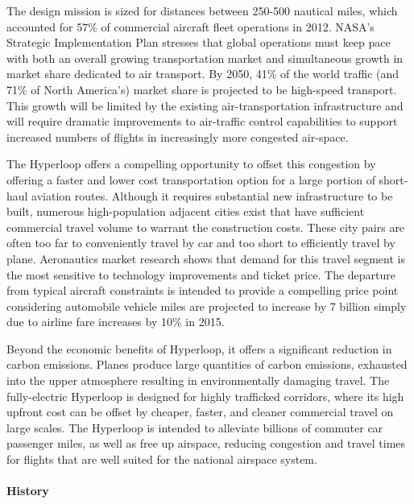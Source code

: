     The design mission is sized for distances between 250-500 nautical miles,
    which accounted for 57\% of commercial aircraft fleet operations in 2012.
    NASA's Strategic Implementation Plan stresses that global operations must
    keep pace with both an overall growing transportation market and
    simultaneous growth in market share dedicated to air transport.
    By 2050, 41\% of the world traffic (and 71\% of North America's) market share is
    projected to be high-speed transport. \cite{Schafer} This growth will be
    limited by the existing air-transportation infrastructure and will require
    dramatic improvements to air-traffic control capabilities to support
    increased numbers of flights in increasingly more congested air-space.

    The Hyperloop offers a compelling opportunity to offset this congestion by
    offering a faster and lower cost transportation option for a large portion
    of short-haul aviation routes. Although it requires substantial
    new infrastructure to be built, numerous high-population adjacent
    cities exist that have sufficient commercial travel volume to warrant the
    construction costs. These city pairs are often too far to conveniently
    travel by car and too short to efficiently travel by plane.
    Aeronautics market research shows that demand for this travel segment is
    the most sensitive to technology improvements and ticket price.\cite{Baik}
    The departure from typical aircraft constraints is intended to provide a
    compelling price point considering automobile vehicle miles are
    projected to increase by 7 billion simply due to airline
    fare increases by 10\% in 2015.

    Beyond the economic benefits of Hyperloop, it offers a significant
    reduction in carbon emissions. Planes produce large quantities of carbon emissions,
    exhausted into the upper atmosphere resulting in environmentally damaging travel.
    The fully-electric Hyperloop is designed for highly trafficked corridors,
    where its high upfront cost can be offset by cheaper, faster, and cleaner
    commercial travel on large scales.
    The Hyperloop is intended to alleviate billions of commuter car passenger miles,
    as well as free up airspace, reducing congestion and travel times for
    flights that are well suited for the national airspace system.\\


\paragraph{History}

